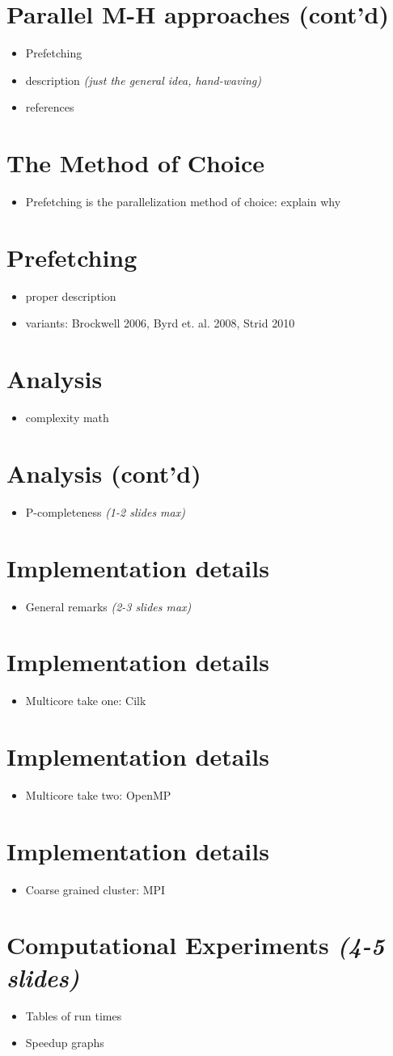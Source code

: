 \documentclass[11pt]{article}       %
\newenvironment{slide}[1]        {\section{#1} \begin{itemize}}%
                                 {\end{itemize}}
\begin{document}
\begin{slide}{Parallel M-H approaches (cont'd)}
\item Prefetching
\item description \emph{(just the general idea, hand-waving)}
\item references
\end{slide}

\begin{slide}{The Method of Choice}
\item Prefetching is the parallelization method of choice: explain why
\end{slide}

\begin{slide}{Prefetching}
\item proper description
\item variants:  Brockwell 2006, Byrd et. al. 2008, Strid 2010
\end{slide}

\begin{slide}{Analysis}
\item complexity math
\end{slide}

\begin{slide}{Analysis (cont'd)}
\item P-completeness \emph{(1-2 slides max)}
\end{slide} 

\begin{slide}{Implementation details}
\item General remarks \emph{(2-3 slides max)}
\end{slide}

\begin{slide}{Implementation details}
\item Multicore take one: Cilk
\end{slide}

\begin{slide}{Implementation details}
\item Multicore take two: OpenMP
\end{slide}

\begin{slide}{Implementation details}
\item Coarse grained cluster: MPI
\end{slide}

\begin{slide}{Computational Experiments \emph{(4-5 slides)}}
\item Tables of run times
\item Speedup graphs
\end{slide}
\end{document}
